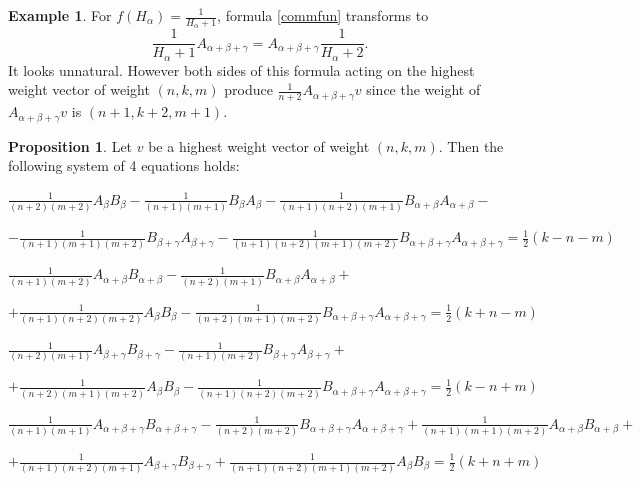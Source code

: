 \documentclass[twoside,a4paper,12pt]{article}
\theoremstyle{definition}
\newtheorem{example}{Example}
\newtheorem{proposition}{Proposition}
\newcommand{\ds}{\displaystyle}
\begin{document}
\begin{example}
	For $f(H_\alpha)=\frac1{H_\alpha+1}$, formula \eqref{commfun} transforms to
	\begin{equation*}
		\frac1{H_\alpha+1}A_{\alpha+\beta+\gamma}=
		A_{\alpha+\beta+\gamma}\frac1{H_\alpha+2}.
	\end{equation*}
	It looks unnatural. However both sides of this formula acting on
	the highest weight vector of weight $(n,k,m)$ produce
	$\frac1{n+2}A_{\alpha+\beta+\gamma}v$ since the weight of
	$A_{\alpha+\beta+\gamma}v$ is $(n+1,k+2,m+1)$.
\end{example}

\begin{proposition}\label{system}
	Let $v$ be a highest weight vector of weight $(n,k,m)$.
	Then the following system of 4 equations holds:
	\begin{flushleft}
		$\ds \frac1{(n+2)(m+2)}A_\beta B_\beta
			-\frac1{(n+1)(m+1)}B_\beta A_\beta
			-\frac1{(n+1)(n+2)(m+1)}B_{\alpha+\beta}A_{\alpha+\beta}-$
	\end{flushleft}
	\begin{flushright}
		$\ds -\frac1{(n+1)(m+1)(m+2)}B_{\beta+\gamma}A_{\beta+\gamma}
			-\frac1{(n+1)(n+2)(m+1)(m+2)}
			B_{\alpha+\beta+\gamma}A_{\alpha+\beta+\gamma}=\frac12(k-n-m)$
	\end{flushright}
	\begin{flushleft}
		$\ds \frac1{(n+1)(m+2)}A_{\alpha+\beta}B_{\alpha+\beta}
			-\frac1{(n+2)(m+1)}B_{\alpha+\beta}A_{\alpha+\beta}+$
	\end{flushleft}
	\begin{flushright}
		$\ds +\frac1{(n+1)(n+2)(m+2)}A_\beta B_\beta-\frac1{(n+2)(m+1)(m+2)}
			B_{\alpha+\beta+\gamma}A_{\alpha+\beta+\gamma}=\frac12(k+n-m)$
	\end{flushright}
	\begin{flushleft}
		$\ds \frac1{(n+2)(m+1)}A_{\beta+\gamma}B_{\beta+\gamma}
			-\frac1{(n+1)(m+2)}B_{\beta+\gamma}A_{\beta+\gamma}+$
	\end{flushleft}
	\begin{flushright}
		$\ds +\frac1{(n+2)(m+1)(m+2)}A_\beta B_\beta-\frac1{(n+1)(n+2)(m+2)}
			B_{\alpha+\beta+\gamma}A_{\alpha+\beta+\gamma}=\frac12(k-n+m)$
	\end{flushright}
	\begin{flushleft}
		$\ds \frac1{(n+1)(m+1)}A_{\alpha+\beta+\gamma}B_{\alpha+\beta+\gamma}
			-\frac1{(n+2)(m+2)}B_{\alpha+\beta+\gamma}A_{\alpha+\beta+\gamma}
			+\frac1{(n+1)(m+1)(m+2)}A_{\alpha+\beta}B_{\alpha+\beta}+$
	\end{flushleft}
	\begin{flushright}
		$\ds +\frac1{(n+1)(n+2)(m+1)}A_{\beta+\gamma}B_{\beta+\gamma}
			+\frac1{(n+1)(n+2)(m+1)(m+2)}A_\beta B_\beta=\frac12(k+n+m)$
	\end{flushright}
\end{proposition}
\end{document}
